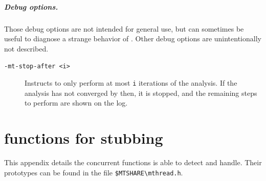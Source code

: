 \documentclass{frama-c-book}
\begin{document}
\paragraph{Debug  options.}

Those debug options are not intended for general use, but can
sometimes be useful to diagnose a strange behavior of \mthread. Other
debug options are unintentionally not described.

\begin{description}
\item[{\tt -mt-stop-after <i>}] Instructs \mthread to only perform
  at most {\tt i} iterations of the analysis. If the analysis has
  not converged by then, it is stopped, and the remaining steps
  to perform are shown on the log.

\end{description}


\appendix

\chapter{\mthread functions for stubbing}
\label{sec:stubbed-functions}
\label{appendix:stubbed-functions}

This appendix details the concurrent functions \mthread is able to
detect and handle.  Their prototypes can be found in the file
\verb+$MTSHARE\mthread.h+.
\end{document}
